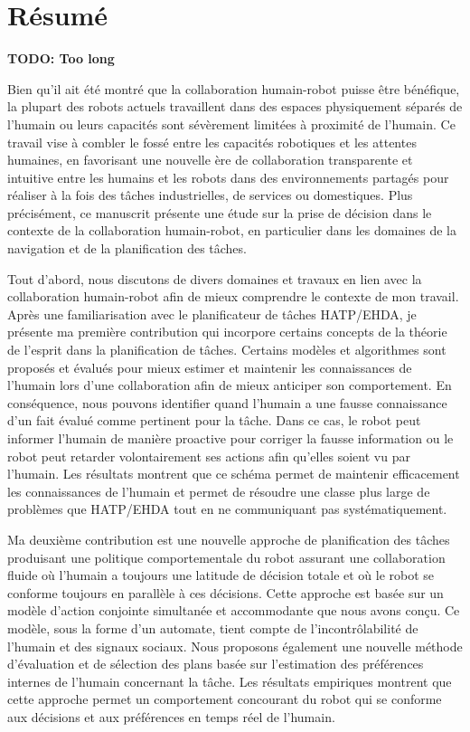 \chapter*{Résumé}

\textbf{TODO: Too long}

Bien qu'il ait été montré que la collaboration humain-robot puisse être bénéfique, la plupart des robots actuels travaillent dans des espaces physiquement séparés de l'humain ou leurs capacités sont sévèrement limitées à proximité de l'humain. Ce travail vise à combler le fossé entre les capacités robotiques et les attentes humaines, en favorisant une nouvelle ère de collaboration transparente et intuitive entre les humains et les robots dans des environnements partagés pour réaliser à la fois des tâches industrielles, de services ou domestiques. Plus précisément, ce manuscrit présente une étude sur la prise de décision dans le contexte de la collaboration humain-robot, en particulier dans les domaines de la navigation et de la planification des tâches.

Tout d'abord, nous discutons de divers domaines et travaux en lien avec la collaboration humain-robot afin de mieux comprendre le contexte de mon travail. Après une familiarisation avec le planificateur de tâches HATP/EHDA, je présente ma première contribution qui incorpore certains concepts de la théorie de l'esprit dans la planification de tâches. Certains modèles et algorithmes sont proposés et évalués pour mieux estimer et maintenir les connaissances de l'humain lors d'une collaboration afin de mieux anticiper son comportement. En conséquence, nous pouvons identifier quand l'humain a une fausse connaissance d'un fait évalué comme pertinent pour la tâche. Dans ce cas, le robot peut informer l'humain de manière proactive pour corriger la fausse information ou le robot peut retarder volontairement ses actions afin qu'elles soient vu par l'humain. Les résultats montrent que ce schéma permet de maintenir efficacement les connaissances de l'humain et permet de résoudre une classe plus large de problèmes que HATP/EHDA tout en ne communiquant pas systématiquement.

Ma deuxième contribution est une nouvelle approche de planification des tâches produisant une politique comportementale du robot assurant une collaboration fluide où l'humain a toujours une latitude de décision totale et où le robot se conforme toujours en parallèle à ces décisions. Cette approche est basée sur un modèle d'action conjointe simultanée et accommodante que nous avons conçu. Ce modèle, sous la forme d'un automate, tient compte de l'incontrôlabilité de l'humain et des signaux sociaux. Nous proposons également une nouvelle méthode d'évaluation et de sélection des plans basée sur l'estimation des préférences internes de l'humain concernant la tâche. Les résultats empiriques montrent que cette approche permet un comportement concourant du robot qui se conforme aux décisions et aux préférences en temps réel de l'humain.

